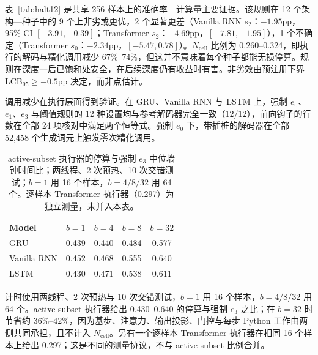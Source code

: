 \documentclass[12pt,a4paper]{article}
\begin{document}
\begin{table}[t]
\label{tab:halt12}
\end{table} 表~\ref{tab:halt12} 是共享 256 样本上的准确率—计算量主要证据。该规则在 12 个架构—种子中的 9 个上非劣或更优，2 个显著更差（Vanilla RNN $s_2$：$-1.95$pp，95\% CI $[-3.91,-0.39]$；Transformer $s_2$：$-4.69$pp，$[-7.81,-1.95]$），1 个不确定（Transformer $s_0$：$-2.34$pp，$[-5.47,0.78]$）。$N_{\mathrm{cell}}$ 比例为 0.260--0.324，即执行的解码与精化调用减少 67\%--74\%，但这并不意味着每个种子都能无损停算。规则在深度一后已饱和处安全，在后续深度仍有收益时有害。非劣效由预注册下界 LCB$_{95}\geq-0.5$pp 决定，而非点估计。

调用减少在执行层面得到验证。在 GRU、Vanilla RNN 与 LSTM 上，强制 $e_0$、$e_1$、$e_3$ 与阈值规则的 12 种设置均与参考解码器完全一致（$12/12$），前向钩子的行数在全部 24 项核对中满足两个恒等式。强制 $e_0$ 下，带插桩的解码器在全部 52{,}458 个生成词元上触发零次精化调用。\begin{table}[t]
\centering
\begin{tabular}{lcccc}
\toprule
Model & $b{=}1$ & $b{=}4$ & $b{=}8$ & $b{=}32$ \\
\midrule
GRU & 0.439 & 0.440 & 0.484 & 0.577 \\
Vanilla RNN & 0.452 & 0.468 & 0.555 & 0.640 \\
LSTM & 0.430 & 0.471 & 0.538 & 0.611 \\
\bottomrule
\end{tabular}
\caption{active-subset 执行器的停算与强制 $e_3$ 中位墙钟时间比；两线程、2 次预热、10 次交错测试；$b{=}1$ 用 16 个样本，$b{=}4/8/32$ 用 64 个。逐样本 Transformer 执行器（0.297）为独立测量，未并入本表。}
\label{tab:wall}
\end{table} 计时使用两线程、2 次预热与 10 次交错测试，$b{=}1$ 用 16 个样本，$b{=}4/8/32$ 用 64 个。active-subset 执行器给出 0.430--0.640 的停算与强制 $e_3$ 之比；在 $b{=}32$ 时节省约 36\%--42\%，因为基步、注意力、输出投影、门控与每步 Python 工作由两侧共同承担，且不计入 $N_{\mathrm{cell}}$。另有一个逐样本 Transformer 执行器在相同 16 个样本上给出 0.297；这是不同的测量协议，不与 active-subset 比例合并。
\end{document}
